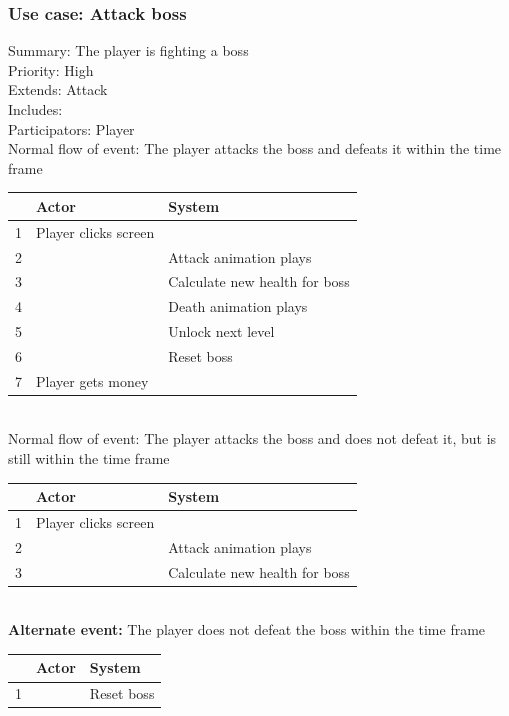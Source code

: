 \documentclass{article}
\begin{document}
\subsubsection{Use case: Attack boss}
Summary: The player is fighting a boss \\
Priority: High \\
Extends: Attack\\
Includes: \\
Participators: Player \\
Normal flow of event: The player attacks the boss and defeats it within the time frame \\
\begin{tabular}{|c|l|l|} \hline
    & Actor & System \\ \hline
    1 & Player clicks screen & \\ \hline
    2 & & Attack animation plays \\ \hline
    3 & & Calculate new health for boss \\ \hline
    4 & & Death animation plays \\ \hline
    5 & & Unlock next level \\ \hline
    6 & & Reset boss \\ \hline
    7 & Player gets money & \\ \hline
\end{tabular}\\
Normal flow of event: The player attacks the boss and does not defeat it, but is still within the time frame \\
\begin{tabular}{|c|l|l|} \hline
    & Actor & System \\ \hline
    1 & Player clicks screen & \\ \hline
    2 & & Attack animation plays \\ \hline
    3 & & Calculate new health for boss \\ \hline
\end{tabular}\\
\textbf{Alternate event:} The player does not defeat the boss within the time frame \\
\begin{tabular}{|c|l|l|} \hline
    & Actor & System \\ \hline
    1 & & Reset boss \\ \hline
\end{tabular}
\end{document}
